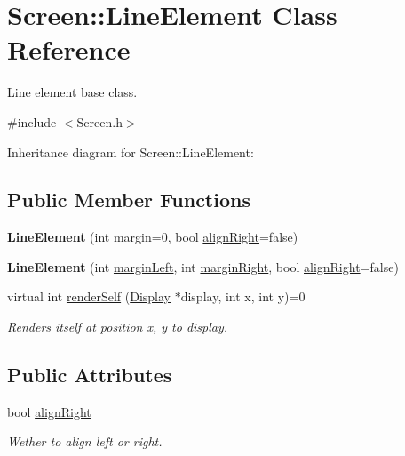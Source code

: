 \hypertarget{classScreen_1_1LineElement}{}\section{Screen\+:\+:Line\+Element Class Reference}
\label{classScreen_1_1LineElement}


Line element base class.  




{\ttfamily \#include $<$Screen.\+h$>$}



Inheritance diagram for Screen\+:\+:Line\+Element\+:
\subsection*{Public Member Functions}
\begin{DoxyCompactItemize}
\item 
\mbox{\label{classScreen_1_1LineElement_a3f822f160e15ee96022b95026e52ee42}} 
{\bfseries Line\+Element} (int margin=0, bool \mbox{\hyperlink{classScreen_1_1LineElement_a0c5f4e33c2df1dce8e4e45b90dac1423}{align\+Right}}=false)
\item 
\mbox{\label{classScreen_1_1LineElement_a65fe216ee2acbc1191b1fd51b25b2ec7}} 
{\bfseries Line\+Element} (int \mbox{\hyperlink{classScreen_1_1LineElement_a9ed23f9510a11334af9be6f53965f7a6}{margin\+Left}}, int \mbox{\hyperlink{classScreen_1_1LineElement_a3a2077f01072be8e8fd0f4539b85beb0}{margin\+Right}}, bool \mbox{\hyperlink{classScreen_1_1LineElement_a0c5f4e33c2df1dce8e4e45b90dac1423}{align\+Right}}=false)
\item 
virtual int \mbox{\hyperlink{classScreen_1_1LineElement_a667fbf6505fbed274ca9a3deac3fef9e}{render\+Self}} (\mbox{\hyperlink{classDisplay}{Display}} $\ast$display, int x, int y)=0
\begin{DoxyCompactList}\small\item\em Renders itself at position x, y to display. \end{DoxyCompactList}\end{DoxyCompactItemize}
\subsection*{Public Attributes}
\begin{DoxyCompactItemize}
\item 
\mbox{\label{classScreen_1_1LineElement_a0c5f4e33c2df1dce8e4e45b90dac1423}} 
bool \mbox{\hyperlink{classScreen_1_1LineElement_a0c5f4e33c2df1dce8e4e45b90dac1423}{align\+Right}}
\begin{DoxyCompactList}\small\item\em Wether to align left or right. \end{DoxyCompactList}\end{DoxyCompactItemize}
